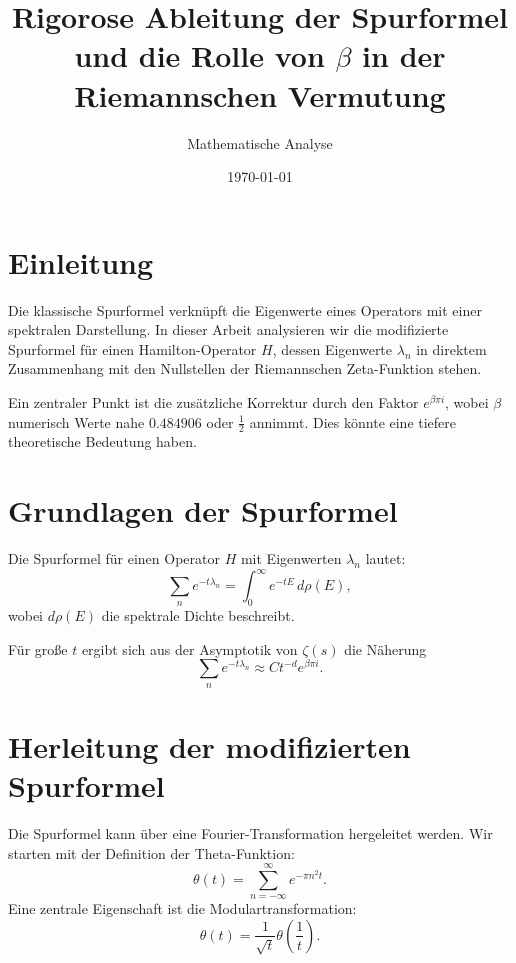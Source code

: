 \documentclass[a4paper,12pt]{article}
\title{Rigorose Ableitung der Spurformel \\ und die Rolle von \( \beta \) in der Riemannschen Vermutung}
\author{Mathematische Analyse}
\date{\today}
\begin{document}
\maketitle

\section{Einleitung}
Die klassische Spurformel verknüpft die Eigenwerte eines Operators mit einer spektralen Darstellung. In dieser Arbeit analysieren wir die modifizierte Spurformel für einen Hamilton-Operator \( H \), dessen Eigenwerte \( \lambda_n \) in direktem Zusammenhang mit den Nullstellen der Riemannschen Zeta-Funktion stehen.

Ein zentraler Punkt ist die zusätzliche Korrektur durch den Faktor \( e^{\beta \pi i} \), wobei \( \beta \) numerisch Werte nahe \( 0.484906 \) oder \( \frac{1}{2} \) annimmt. Dies könnte eine tiefere theoretische Bedeutung haben.

\section{Grundlagen der Spurformel}
Die Spurformel für einen Operator \( H \) mit Eigenwerten \( \lambda_n \) lautet:
\begin{equation}
    \sum_n e^{-t \lambda_n} = \int_0^\infty e^{-t E} \, d\rho(E),
\end{equation}
wobei \( d\rho(E) \) die spektrale Dichte beschreibt.

Für große \( t \) ergibt sich aus der Asymptotik von \( \zeta(s) \) die Näherung
\begin{equation}
    \sum_n e^{-t \lambda_n} \approx C t^{-d} e^{\beta \pi i}.
\end{equation}

\section{Herleitung der modifizierten Spurformel}
Die Spurformel kann über eine Fourier-Transformation hergeleitet werden. Wir starten mit der Definition der Theta-Funktion:
\begin{equation}
    \theta(t) = \sum_{n=-\infty}^{\infty} e^{- \pi n^2 t}.
\end{equation}
Eine zentrale Eigenschaft ist die Modulartransformation:
\begin{equation}
    \theta(t) = \frac{1}{\sqrt{t}} \theta\left(\frac{1}{t}\right).
\end{equation}
\end{document}
